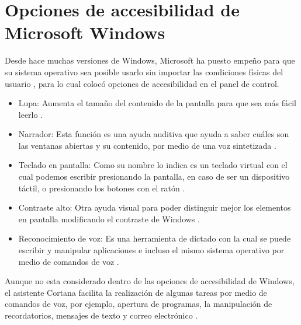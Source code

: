 \section{Opciones de accesibilidad de Microsoft Windows}

Desde hace muchas versiones de Windows, Microsoft ha puesto empeño para que su
 sistema operativo sea posible usarlo sin importar las condiciones físicas del
 usuario \cite{DanielHubbell2016}, para lo cual colocó opciones de
 accesibilidad en el panel de control.

\begin{itemize}
	\item Lupa: Aumenta el tamaño del contenido de la pantalla para que sea más
	 fácil leerlo \cite{xatakaaccesiblilidad}.
	\item Narrador:  Esta función es una ayuda auditiva que ayuda a saber cuáles
	 son las ventanas abiertas y su contenido, por medio de una voz sintetizada
	 \cite{xatakaaccesiblilidad}.
	\item Teclado en pantalla: Como su nombre lo indica es un teclado virtual
	 con el cual podemos escribir presionando la pantalla, en caso de ser un
	 dispositivo táctil, o presionando los botones con el ratón
	 \cite{xatakaaccesiblilidad}.
	 \item Contraste alto: Otra ayuda visual para poder distinguir mejor los
	  elementos en pantalla modificando el contraste de Windows
	  \cite{xatakaaccesiblilidad}.
	  \item Reconocimiento de voz: Es una herramienta de dictado con la cual se
	   puede escribir y manipular aplicaciones e incluso el mismo sistema
	   operativo por medio de comandos de voz \cite{support14213}.
\end{itemize}
	   
Aunque no esta considerado dentro de las opciones de accesibilidad de Windows,
 el asistente Cortana facilita la realización de algunas tareas por medio de
 comandos de voz, por ejemplo, apertura de programas, la manipulación de
 recordatorios, mensajes de texto y correo electrónico \cite{support17214}. 
